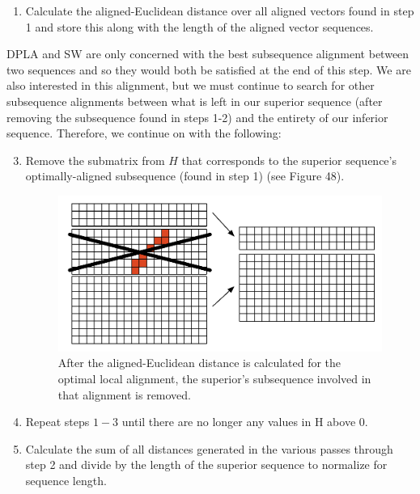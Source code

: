 \documentclass[12pt]{report} 	%
\numberwithin{figure}{chapter}
\numberwithin{table}{chapter}
\numberwithin{equation}{chapter}
\begin{document}
\begin{flushleft}
\begin{enumerate}
\item Calculate the aligned-Euclidean distance over all aligned vectors found in step 1 
\clearpage
and store this along with the length of the aligned vector sequences.
\end{enumerate}
DPLA and SW are only concerned with the best subsequence alignment between two sequences and so they would both be satisfied at the end of this step. We are also interested in this alignment, but we must continue to search for other subsequence alignments between what is left in our superior sequence (after removing the subsequence found in steps 1-2) and the entirety of our inferior sequence. Therefore, we continue on with the following:
\begin{enumerate}
\setcounter{enumi}{2}
\item Remove the submatrix from $H$ that corresponds to the superior sequence's optimally-aligned subsequence (found in step 1) (see Figure 48).
\begin{figure}[h!]
\vspace{24pt}
\begin{center}
\includegraphics[scale=0.8]{SIC-DPLA_2}
\caption[Removing the optimal subsequence]{After the aligned-Euclidean distance is calculated for the optimal local alignment, the superior's subsequence involved in that alignment is removed.}
\end{center}
\end{figure}
\item Repeat steps $1-3$ until there are no longer any values in H above 0.
\item Calculate the sum of all distances generated in the various passes through step 2 and divide by the length of the superior sequence to normalize for sequence length.
\end{enumerate}


\end{flushleft}
\end{document}
